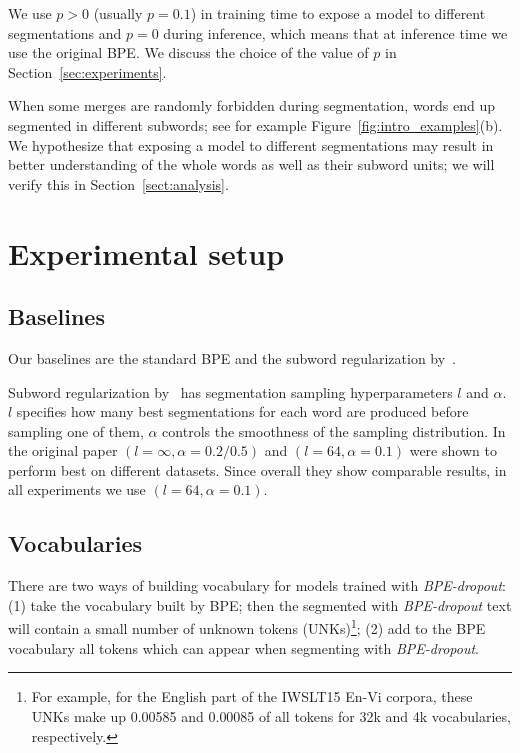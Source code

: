 \documentclass[11pt,a4paper]{article}
\begin{document}
We use $p>0$ (usually $p=0{.}1$) in training time to expose a model to different segmentations and $p=0$ during inference, which means that at inference time we use the original BPE. We discuss the choice of the value of $p$ in Section~\ref{sec:experiments}.


When some merges are randomly forbidden during segmentation, words end up segmented in different subwords; see for example Figure~\ref{fig:intro_examples}(b). We hypothesize that exposing a model to different segmentations may result in better understanding of the whole words as well as their subword units; we will verify this in Section~\ref{sect:analysis}. 


\section{Experimental setup}
\label{sec:exp_setup}


\subsection{Baselines}

Our baselines are the standard BPE and the subword regularization by~\citet{sentencepiece}.


Subword regularization by~\citet{sentencepiece} has segmentation sampling hyperparameters $l$ and $\alpha$. $l$ specifies how many best segmentations for each word are produced before sampling one of them, $\alpha$ controls the smoothness of the sampling distribution. In the original paper $(l=\infty, \alpha=0{.}2/0{.}5)$ and  $(l=64, \alpha=0{.}1)$ were shown to perform best on different datasets. Since overall they show comparable results, in all experiments we use $(l=64, \alpha=0{.}1)$. 


\subsection{Vocabularies}

There are two ways of building vocabulary for models trained with \textit{BPE-dropout}:
(1) take the vocabulary built by BPE; then the segmented with \textit{BPE-dropout} text will contain a small number of unknown tokens (\textsc{UNK}s)\footnote{For example, for the English part of the IWSLT15 En-Vi corpora, these \textsc{UNK}s make up 0{.}00585 and 0{.}00085 of all tokens for 32k and 4k vocabularies, respectively.};
    (2) add to the BPE vocabulary all tokens which can appear when segmenting with \textit{BPE-dropout}. 
\end{document}
